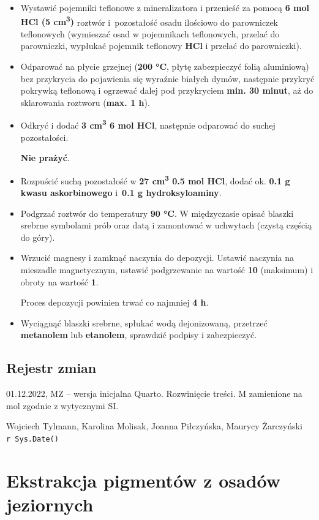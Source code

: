 \documentclass[
  letterpaper,
  DIV=11,
  numbers=noendperiod]{scrreprt}
\begin{document}
\begin{itemize}
\item
  Wystawić pojemniki teflonowe z mineralizatora i przenieść za pomocą
  \textbf{6 mol HCl (5 cm\textsuperscript{3})} roztwór i~pozostałość
  osadu ilościowo do parowniczek teflonowych (wymieszać osad w
  pojemnikach teflonowych, przelać do parowniczki, wypłukać pojemnik
  teflonowy \textbf{HCl} i przelać do parowniczki).
\item
  Odparować na płycie grzejnej (\textbf{200 °C}, płytę zabezpieczyć
  folią aluminiową) bez przykrycia do pojawienia się wyraźnie białych
  dymów, następnie przykryć pokrywką teflonową i ogrzewać dalej pod
  przykryciem \textbf{min. 30 minut}, aż do sklarowania roztworu
  (\textbf{max. 1 h}).
\item
  Odkryć i dodać \textbf{3 cm\textsuperscript{3} 6 mol HCl}, następnie
  odparować do suchej pozostałości.

  \textbf{Nie prażyć}.
\item
  Rozpuścić suchą pozostałość w \textbf{27 cm\textsuperscript{3} 0.5 mol
  HCl}, dodać ok. \textbf{0.1 g kwasu askorbinowego} i~\textbf{0.1 g
  hydroksyloaminy}.
\item
  Podgrzać roztwór do temperatury \textbf{90 °C}. W międzyczasie opisać
  blaszki srebrne symbolami prób oraz datą i zamontować w uchwytach
  (czystą częścią do góry).
\item
  Wrzucić magnesy i zamknąć naczynia do depozycji. Ustawić naczynia na
  mieszadle magnetycznym, ustawić podgrzewanie na wartość \textbf{10}
  (maksimum) i obroty na wartość \textbf{1}.

  Proces depozycji powinien trwać co najmniej \textbf{4 h}.
\item
  Wyciągnąć blaszki srebrne, spłukać wodą dejonizowaną, przetrzeć
  \textbf{metanolem} lub \textbf{etanolem}, sprawdzić podpisy i
  zabezpieczyć.
\end{itemize}

\hypertarget{rejestr-zmian-13}{%
\section{Rejestr zmian}\label{rejestr-zmian-13}}

01.12.2022, MZ -- wersja inicjalna Quarto. Rozwinięcie treści. M
zamienione na mol zgodnie z wytycznymi SI.

Wojciech Tylmann, Karolina Molisak, Joanna Piłczyńska, Maurycy
Żarczyński \texttt{r\ Sys.Date()}

\hypertarget{ekstrakcja-pigmentuxf3w-z-osaduxf3w-jeziornych}{%
\chapter{Ekstrakcja pigmentów z osadów
jeziornych}\label{ekstrakcja-pigmentuxf3w-z-osaduxf3w-jeziornych}}
\end{document}
